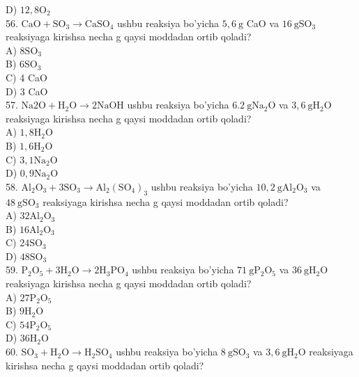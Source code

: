 D) $12,8 \mathrm{O}_{2}$\\
56. $\mathrm{CaO}+\mathrm{SO}_{3} \rightarrow \mathrm{CaSO}_{4}$ ushbu reaksiya bo'yicha $5,6 \mathrm{~g}$ CaO va $16 \mathrm{~g} \mathrm{SO}_{3}$ reaksiyaga kirishsa necha g qaysi moddadan ortib qoladi?\\
A) $8 \mathrm{SO}_{3}$\\
B) $6 \mathrm{SO}_{3}$\\
C) 4 CaO\\
D) 3 CaO\\
57. $\mathrm{Na} 2 \mathrm{O}+\mathrm{H}_{2} \mathrm{O} \rightarrow 2 \mathrm{NaOH}$ ushbu reaksiya bo'yicha $6.2 \mathrm{~g} \mathrm{Na}_{2} \mathrm{O}$ va $3,6 \mathrm{~g} \mathrm{H}_{2} \mathrm{O}$\\
reaksiyaga kirishsa necha g qaysi moddadan ortib qoladi?\\
A) $1,8 \mathrm{H}_{2} \mathrm{O}$\\
B) $1,6 \mathrm{H}_{2} \mathrm{O}$\\
C) $3,1 \mathrm{Na}_{2} \mathrm{O}$\\
D) $0,9 \mathrm{Na}_{2} \mathrm{O}$\\
58. $\mathrm{Al}_{2} \mathrm{O}_{3}+3 \mathrm{SO}_{3} \rightarrow \mathrm{Al}_{2}\left(\mathrm{SO}_{4}\right)_{3}$ ushbu reaksiya bo'yicha $10,2 \mathrm{~g} \mathrm{Al}_{2} \mathrm{O}_{3}$ va $48 \mathrm{~g} \mathrm{SO}_{3}$ reaksiyaga kirishsa necha g qaysi moddadan ortib qoladi?\\
A) $32 \mathrm{Al}_{2} \mathrm{O}_{3}$\\
B) $16 \mathrm{Al}_{2} \mathrm{O}_{3}$\\
C) $24 \mathrm{SO}_{3}$\\
D) $48 \mathrm{SO}_{3}$\\
59. $\mathrm{P}_{2} \mathrm{O}_{5}+3 \mathrm{H}_{2} \mathrm{O} \rightarrow 2 \mathrm{H}_{3} \mathrm{PO}_{4}$ ushbu reaksiya bo'yicha $71 \mathrm{~g} \mathrm{P}_{2} \mathrm{O}_{5}$ va $36 \mathrm{~g} \mathrm{H}_{2} \mathrm{O}$ reaksiyaga kirishsa necha g qaysi moddadan ortib qoladi?\\
A) $27 \mathrm{P}_{2} \mathrm{O}_{5}$\\
B) $9 \mathrm{H}_{2} \mathrm{O}$\\
C) $54 \mathrm{P}_{2} \mathrm{O}_{5}$\\
D) $36 \mathrm{H}_{2} \mathrm{O}$\\
60. $\mathrm{SO}_{3}+\mathrm{H}_{2} \mathrm{O} \rightarrow \mathrm{H}_{2} \mathrm{SO}_{4}$ ushbu reaksiya bo'yicha $8 \mathrm{~g} \mathrm{SO}_{3}$ va $3,6 \mathrm{~g} \mathrm{H}_{2} \mathrm{O}$ reaksiyaga kirishsa necha g qaysi moddadan ortib qoladi?\\
